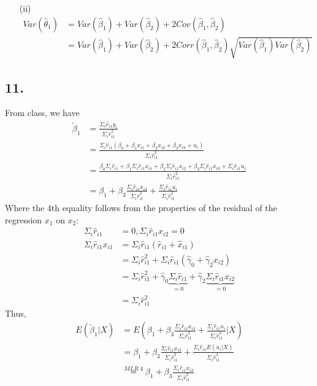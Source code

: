 \documentclass[
]{article}
\begin{document}
\begin{enumerate}
\item[(ii)]
\[\begin{aligned}
Var(\hat\theta_1) &= Var(\hat\beta_1) + Var(\hat\beta_2) + 2Cov(\hat\beta_1,\hat\beta_2) \\
&=  Var(\hat\beta_1) + Var(\hat\beta_2) + 2 Corr(\hat\beta_1,\hat\beta_2)\sqrt{Var(\hat\beta_1)Var(\hat\beta_2)}\end{aligned}\]  

\end{enumerate}

\hypertarget{section-1}{%
\subsection{11.}\label{section-1}}

From class, we have \[\begin{aligned}
\tilde\beta_1 &=\frac{\Sigma_i \hat r_{i1}y_i}{\Sigma_i \hat r_{i1}^2} \\
&= \frac{\Sigma_i \hat r_{i1}(\beta_0 + \beta_1x_{i1} + \beta_2x_{i2} + \beta_3x_{i3} + u_i)}{\Sigma_i \hat r_{i1}^2} \\
&= \frac{\beta_0\Sigma_i \hat r_{i1} + \beta_1 \Sigma_i \hat r_{i1}x_{i1} + \beta_2\Sigma_i \hat r_{i1}x_{i2} + \beta_3 \Sigma_i \hat r_{i1}x_{i3} + \Sigma_i \hat r_{i1}u_i}{\Sigma_i \hat r_{i1}^2} \\
&= \beta_1 + \beta_3\frac{\Sigma_i \hat r_{i1}x_{i3}}{\Sigma_i \hat r_{i1}^2} +\frac{\Sigma_i \hat r_{i1}u_i}{\Sigma_i \hat r_{i1}^2}
\end{aligned}\] Where the 4th equality follows from the properties of
the residual of the regression \(x_1\) on \(x_2\): \[\begin{aligned}
\Sigma_i \hat r_{i1} &= 0, \Sigma_i \hat r_{i1}x_{i2} = 0 \\
\Sigma_i \hat r_{i1}x_{i1} &= \Sigma_i \hat r_{i1}(\hat r_{i1} + \hat x_{i1}) \\
&= \Sigma_i \hat r_{i1}^2 + \Sigma_i \hat r_{i1}(\hat\gamma_0 + \hat\gamma_2x_{i2}) \\
&= \Sigma_i \hat r_{i1}^2 + \hat\gamma_0\underbrace{\Sigma_i \hat r_{i1}}_{=0} + \hat\gamma_2\underbrace{\Sigma_i \hat r_{i1}x_{i2}}_{=0}\\
&= \Sigma_i \hat r_{i1}^2
\end{aligned}\] Thus, \[\begin{aligned}
E(\tilde\beta_1|X) &= E(\beta_1 + \beta_3\frac{\Sigma_i \hat r_{i1}x_{i3}}{\Sigma_i \hat r_{i1}^2} +\frac{\Sigma_i \hat r_{i1}u_i}{\Sigma_i \hat r_{i1}^2}|X) \\
&= \beta_1 + \beta_3\frac{\Sigma_i \hat r_{i1}x_{i3}}{\Sigma_i \hat r_{i1}^2} +\frac{\Sigma_i \hat r_{i1}E(u_i|X)}{\Sigma_i \hat r_{i1}^2} \\
&\stackrel{MLR\:4}= \beta_1 + \beta_3\frac{\Sigma_i \hat r_{i1}x_{i3}}{\Sigma_i \hat r_{i1}^2} 
\end{aligned}\]
\end{document}

